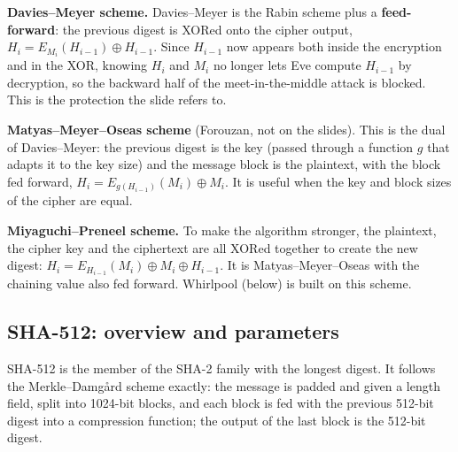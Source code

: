 \textbf{Davies--Meyer scheme.} Davies--Meyer is the Rabin scheme plus a \textbf{feed-forward}: the previous digest is XORed onto the cipher output, $H_i = E_{M_i}(H_{i-1}) \oplus H_{i-1}$. Since $H_{i-1}$ now appears both inside the encryption and in the XOR, knowing $H_i$ and $M_i$ no longer lets Eve compute $H_{i-1}$ by decryption, so the backward half of the meet-in-the-middle attack is blocked. This is the protection the slide refers to.

\textbf{Matyas--Meyer--Oseas scheme} (Forouzan, not on the slides). This is the dual of Davies--Meyer: the previous digest is the key (passed through a function $g$ that adapts it to the key size) and the message block is the plaintext, with the block fed forward, $H_i = E_{g(H_{i-1})}(M_i) \oplus M_i$. It is useful when the key and block sizes of the cipher are equal.

\textbf{Miyaguchi--Preneel scheme.} To make the algorithm stronger, the plaintext, the cipher key and the ciphertext are all XORed together to create the new digest: $H_i = E_{H_{i-1}}(M_i) \oplus M_i \oplus H_{i-1}$. It is Matyas--Meyer--Oseas with the chaining value also fed forward. Whirlpool (below) is built on this scheme.

\subsection{SHA-512: overview and parameters \hot}

SHA-512 is the member of the SHA-2 family with the longest digest. It follows the Merkle--Damg\aa rd scheme exactly: the message is padded and given a length field, split into 1024-bit blocks, and each block is fed with the previous 512-bit digest into a compression function; the output of the last block is the 512-bit digest.

